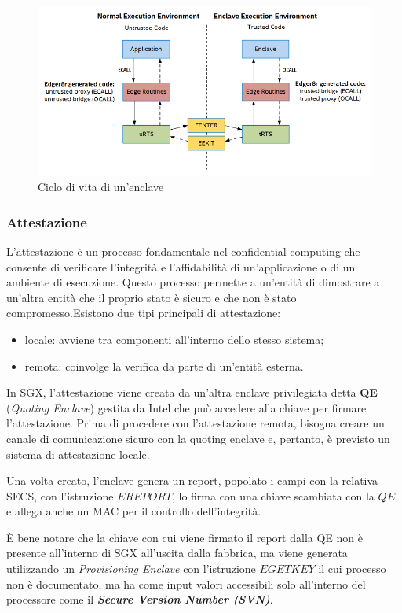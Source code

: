 \documentclass{article}
\begin{document}
\begin{figure}
  \begin{center}
    \includegraphics[width=.85\textwidth]{figures/ch1/enclave-lifecycle.png}
  \end{center}
  \caption{Ciclo di vita di un'enclave}\label{fig:enclave-lifecycle}
\end{figure}

\subsubsection{Attestazione}
L'attestazione è un processo fondamentale nel confidential computing che consente di verificare l'integrità e l'affidabilità di un'applicazione o di un ambiente di esecuzione. Questo processo permette a un'entità di dimostrare a un'altra entità che il proprio stato è sicuro e che non è stato compromesso.Esistono due tipi principali di attestazione: 
\begin{itemize}
  \item locale: avviene tra componenti all'interno dello stesso sistema;
  \item remota: coinvolge la verifica da parte di un'entità esterna.
\end{itemize}

In SGX, l'attestazione viene creata da un'altra enclave privilegiata detta \textbf{QE} (\textit{Quoting Enclave}) gestita da Intel che può accedere alla chiave per firmare l'attestazione. Prima di procedere con l'attestazione remota, bisogna creare un canale di comunicazione sicuro con la quoting enclave e, pertanto, è previsto un sistema di attestazione locale. 

Una volta creato, l'enclave genera un report, popolato i campi con la relativa SECS, con l'istruzione $EREPORT$, lo firma con una chiave scambiata con la $QE$ e allega anche un MAC per il controllo dell'integrità.

È bene notare che la chiave con cui viene firmato il report dalla QE non è presente all'interno di SGX all'uscita dalla fabbrica, ma viene generata utilizzando un \textit{Provisioning Enclave} con l'istruzione $EGETKEY$ il cui processo non è documentato, ma ha come input valori accessibili solo all'interno del processore come il \textbf{\textit{Secure Version Number (SVN)}}.
\end{document}
